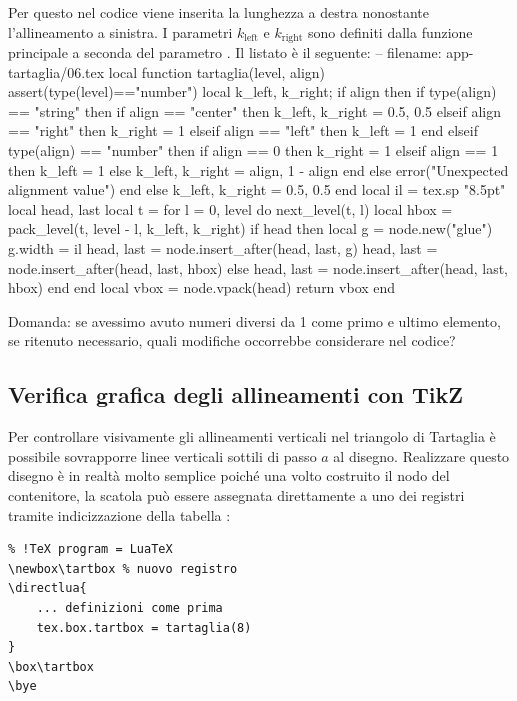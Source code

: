Per questo nel codice viene inserita la lunghezza a destra nonostante
l'allineamento a sinistra. I parametri \( k_\mathrm{left} \) e \(
k_\mathrm{right} \) sono definiti dalla funzione principale  a
seconda del parametro . Il listato è il seguente:
\lines
-- filename: app-tartaglia/06.tex
local function tartaglia(level, align)
    assert(type(level)=="number")
    local k_left, k_right; if align then
        if type(align) == "string" then
            if align == "center" then
                k_left, k_right = 0.5, 0.5
            elseif align == "right" then
                k_right = 1
            elseif align == "left" then
                k_left = 1
            end
        elseif type(align) == "number" then
            if align == 0 then
                k_right = 1
            elseif align == 1 then
                k_left = 1
            else
                k_left, k_right = align, 1 - align
            end
        else
            error("Unexpected alignment value")
        end
    else
        k_left, k_right = 0.5, 0.5
    end
    local il = tex.sp "8.5pt"
    local head, last
    local t = {}
    for l = 0, level do
        next_level(t, l)
        local hbox = pack_level(t, level - l, k_left, k_right)
        if head then
            local g = node.new("glue")
            g.width = il
            head, last = node.insert_after(head, last, g)
            head, last = node.insert_after(head, last, hbox)
        else
            head, last = node.insert_after(head, last, hbox)
        end
    end
    local vbox = node.vpack(head)
    return vbox
end
\endlines
{}

Domanda: se avessimo avuto numeri diversi da 1 come primo e ultimo elemento, se
ritenuto necessario, quali modifiche occorrebbe considerare nel codice?


\subsection{Verifica grafica degli allineamenti con TikZ}

Per controllare visivamente gli allineamenti verticali nel triangolo di
Tartaglia è possibile sovrapporre linee verticali sottili di passo \( a \) al
disegno. Realizzare questo disegno è in realtà molto semplice poiché una volto
costruito il nodo del contenitore, la scatola può essere assegnata direttamente
a uno dei registri tramite indicizzazione della tabella :
\begin{Verbatim}
% !TeX program = LuaTeX
\newbox\tartbox % nuovo registro
\directlua{
    ... definizioni come prima
    tex.box.tartbox = tartaglia(8)
}
\box\tartbox
\bye
\end{Verbatim}


